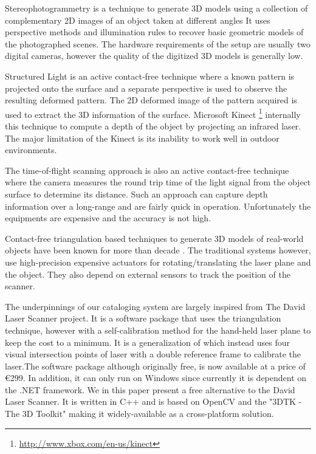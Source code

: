 Stereophotogrammetry \cite{li:2004, debevec:1996} is a technique to generate
3D models using a collection of complementary 2D images of an object taken at
different angles It uses perspective methods and illumination rules to recover
basic geometric models of the photographed scenes. The hardware requirements
of the setup are usually two digital cameras, however the quality of the
digitized 3D models is generally low.

Structured Light is an active contact-free technique where a known pattern is
projected onto the surface and a separate perspective is used to observe the
resulting deformed pattern. The 2D deformed image of the pattern acquired is
used to extract the 3D information of the surface. Microsoft Kinect
\footnote{\href{http://www.xbox.com/en-us/kinect}{http://www.xbox.com/en-us/kinect}}
internally this technique to compute a depth of the object by projecting an
infrared laser. The major limitation of the Kinect is its inability to work
well in outdoor environments.

The time-of-flight scanning approach \cite{nielsen:1996} is also
an active contact-free technique where the camera measures the round trip time
of the light signal from the object surface to determine its distance. Such an
approach can capture depth information over a long-range and are fairly quick
in operation. Unfortunately the equipments are expensive and the accuracy is
not high.

Contact-free triangulation based techniques to generate 3D models of
real-world objects have been known for more than decade \cite{beraldin:1999,
cortelazzo:2004}. The traditional systems however, use high-precision
expensive actuators for rotating/translating the laser plane and the object.
They also depend on external sensors to track the position of the scanner.

The underpinnings of our cataloging system are largely inspired from The David
Laser Scanner \cite{winkelbach:2006} project.  It is a software package that
uses the triangulation technique, however with a self-calibration method for
the hand-held laser plane to keep the cost to a minimum. It is a
generalization of \cite{zagorchev:2006} which instead uses four visual
intersection points of laser with a double reference frame to calibrate the
laser.The software package although originally free, is now available at a
price of \euro 299. In addition, it can only run on Windows since currently it
is dependent on the .NET framework. We in this paper present a free
alternative to the David Laser Scanner. It is written in C++ and is based on
OpenCV and the "3DTK - The 3D Toolkit" \cite{3dtk:2012} making it
widely-available as a cross-platform solution.
